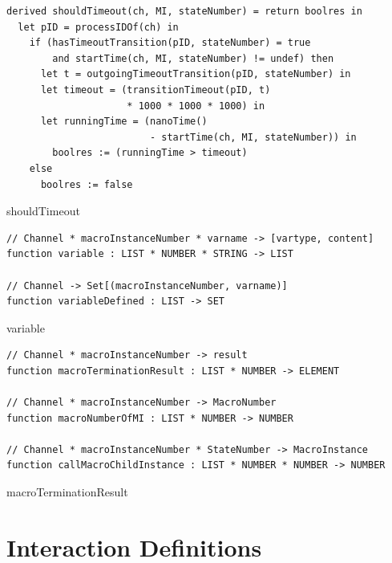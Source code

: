 \begin{listing}[H]
\begin{verbatim}
derived shouldTimeout(ch, MI, stateNumber) = return boolres in
  let pID = processIDOf(ch) in
    if (hasTimeoutTransition(pID, stateNumber) = true
        and startTime(ch, MI, stateNumber) != undef) then
      let t = outgoingTimeoutTransition(pID, stateNumber) in
      let timeout = (transitionTimeout(pID, t)
                     * 1000 * 1000 * 1000) in
      let runningTime = (nanoTime()
                         - startTime(ch, MI, stateNumber)) in
        boolres := (runningTime > timeout)
    else
      boolres := false
\end{verbatim}
\caption{shouldTimeout}
\label{lst:asm:shouldTimeout}
\end{listing}


\begin{listing}[H]
\begin{verbatim}
// Channel * macroInstanceNumber * varname -> [vartype, content]
function variable : LIST * NUMBER * STRING -> LIST

// Channel -> Set[(macroInstanceNumber, varname)]
function variableDefined : LIST -> SET
\end{verbatim}
\caption{variable}
\label{lst:asm:variable}
\end{listing}


\begin{listing}[H]
\begin{verbatim}
// Channel * macroInstanceNumber -> result
function macroTerminationResult : LIST * NUMBER -> ELEMENT

// Channel * macroInstanceNumber -> MacroNumber
function macroNumberOfMI : LIST * NUMBER -> NUMBER

// Channel * macroInstanceNumber * StateNumber -> MacroInstance
function callMacroChildInstance : LIST * NUMBER * NUMBER -> NUMBER
\end{verbatim}
\caption{macroTerminationResult}
\label{lst:asm:macroTerminationResult}
\end{listing}


\section{Interaction Definitions}

